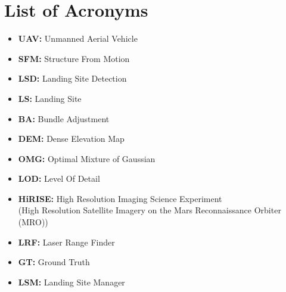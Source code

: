 \chapter*{List of Acronyms}

\begin{itemize}
    \item \textbf{UAV: } Unmanned Aerial Vehicle
    \item \textbf{SFM: } Structure From Motion
    \item \textbf{LSD: } Landing Site Detection
    \item \textbf{LS: } Landing Site 
    \item \textbf{BA: } Bundle Adjustment
    \item \textbf{DEM: } Dense Elevation Map
    \item \textbf{OMG: } Optimal Mixture of Gaussian
    \item \textbf{LOD: } Level Of Detail
    \item \textbf{HiRISE: } High Resolution Imaging Science Experiment \\(High Resolution Satellite Imagery on the Mars Reconnaissance Orbiter (MRO))
    \item \textbf{LRF: } Laser Range Finder
    \item \textbf{GT: } Ground Truth
    \item \textbf{LSM: } Landing Site Manager
\end{itemize}
